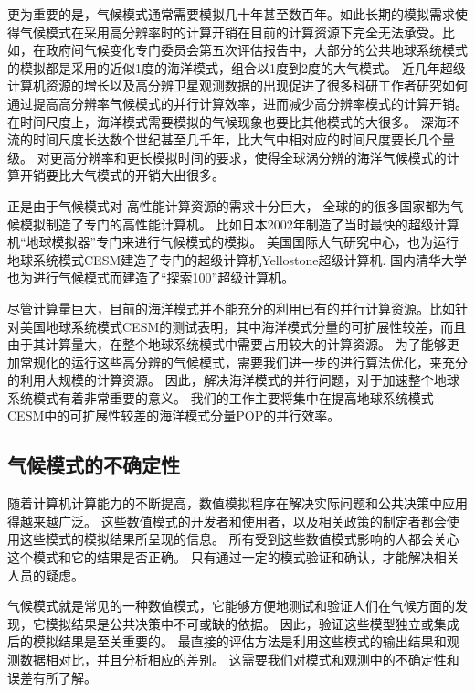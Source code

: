 更为重要的是，气候模式通常需要模拟几十年甚至数百年。如此长期的模拟需求使得气候模式在采用高分辨率时的计算开销在目前的计算资源下完全无法承受。比如，在政府间气候变化专门委员会第五次评估报告中，大部分的公共地球系统模式的模拟都是采用的近似1度的海洋模式，组合以1度到2度的大气模式。
近几年超级计算机资源的增长以及高分辨卫星观测数据的出现促进了很多科研工作者研究如何通过提高高分辨率气候模式的并行计算效率，进而减少高分辨率模式的计算开销。
在时间尺度上，海洋模式需要模拟的气候现象也要比其他模式的大很多。 深海环流的时间尺度长达数个世纪甚至几千年，比大气中相对应的时间尺度要长几个量级。
对更高分辨率和更长模拟时间的要求，使得全球涡分辨的海洋气候模式的计算开销要比大气模式的开销大出很多\cite{bryan2010frontal,mcclean2011prototype,graham2014importance}。

正是由于气候模式对 高性能计算资源的需求十分巨大， 全球的的很多国家都为气候模拟制造了专门的高性能计算机。 比如日本2002年制造了当时最快的超级计算机“地球模拟器”专门来进行气候模式的模拟\cite{habata2003earth}。
美国国际大气研究中心，也为运行地球系统模式CESM建造了专门的超级计算机Yellostone超级计算机\cite{loft:2015}. 
国内清华大学也为进行气候模式而建造了“探索100”超级计算机。



尽管计算量巨大，目前的海洋模式并不能充分的利用已有的并行计算资源。比如针对美国地球系统模式CESM的测试表明，其中海洋模式分量的可扩展性较差，而且由于其计算量大，在整个地球系统模式中需要占用较大的计算资源。
为了能够更加常规化的运行这些高分辨的气候模式，需要我们进一步的进行算法优化，来充分的利用大规模的计算资源。
因此，解决海洋模式的并行问题，对于加速整个地球系统模式有着非常重要的意义。
我们的工作主要将集中在提高地球系统模式CESM中的可扩展性较差的海洋模式分量POP的并行效率。  
 

\subsection{气候模式的不确定性}
随着计算机计算能力的不断提高，数值模拟程序在解决实际问题和公共决策中应用得越来越广泛。 
这些数值模式的开发者和使用者，以及相关政策的制定者都会使用这些模式的模拟结果所呈现的信息。
所有受到这些数值模式影响的人都会关心这个模式和它的结果是否正确。
只有通过一定的模式验证和确认，才能解决相关人员的疑虑\cite{whitner1989guidelines,stainforth2005uncertainty}。

气候模式就是常见的一种数值模式，它能够方便地测试和验证人们在气候方面的发现，它模拟结果是公共决策中不可或缺的依据\cite{allen2002towards,reynolds1994random}。
因此，验证这些模型独立或集成后的模拟结果是至关重要的。
最直接的评估方法是利用这些模式的输出结果和观测数据相对比，并且分析相应的差别。 
这需要我们对模式和观测中的不确定性和误差有所了解。 


